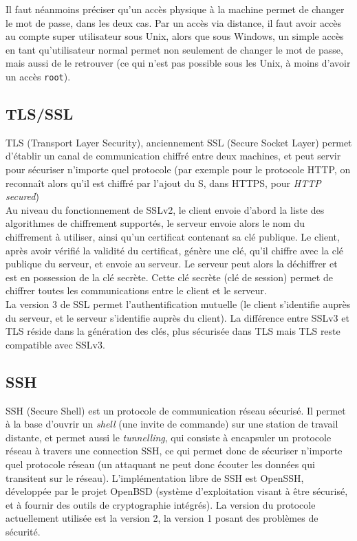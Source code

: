 Il faut néanmoins préciser qu'un accès physique à la machine
permet de changer le mot de passe, dans les deux cas. Par un accès
via distance, il faut avoir accès au compte super utilisateur sous
Unix, alors que sous Windows, un simple accès en tant
qu'utilisateur normal permet non seulement de changer le mot de
passe, mais aussi de le retrouver (ce qui n'est pas possible sous
les Unix, à moins d'avoir un accès \texttt{root}).
\subsection{TLS/SSL}
TLS (Transport Layer Security), anciennement SSL (Secure Socket
Layer) permet d'établir un canal de communication chiffré entre
deux machines, et peut servir pour sécuriser n'importe quel
protocole (par exemple pour le protocole HTTP, on reconnaît alors qu'il
est chiffré par l'ajout du S, dans HTTPS, pour \emph{HTTP
secured})
\\
 
Au niveau du fonctionnement de SSLv2, le client envoie d'abord la liste des
algorithmes de chiffrement supportés, le serveur envoie alors le
nom du chiffrement à utiliser, ainsi qu'un
certificat contenant sa clé publique. Le client, après avoir
vérifié la validité du certificat, génère une clé, qu'il
chiffre avec la clé publique du serveur, et envoie au serveur.
Le serveur peut alors la déchiffrer et est
en possession de la clé secrète.
Cette clé secrète (clé de session) permet de chiffrer toutes les
communications entre le client et le serveur.
\\

La version 3 de SSL permet l'authentification mutuelle (le client
s'identifie auprès du serveur, et le serveur s'identifie auprès du
client). La différence entre SSLv3 et TLS réside dans la
génération des clés, plus sécurisée dans TLS mais TLS reste
compatible avec SSLv3.

\subsection{SSH}
SSH (Secure Shell) est un protocole de communication réseau
sécurisé. Il permet à la base d'ouvrir un \emph{shell} (une invite
de commande) sur une station de travail distante, et permet aussi
le \emph{tunnelling}, qui consiste à encapsuler un protocole
réseau à travers une connection SSH, ce qui permet donc de
sécuriser n'importe quel protocole réseau (un attaquant ne peut
donc écouter les données qui transitent sur le réseau).
L'implémentation libre de SSH est OpenSSH, développée par le
projet OpenBSD (système d'exploitation visant à être sécurisé, et
à fournir des outils de cryptographie intégrés). La version 
du protocole
actuellement utilisée est la version 2, la version 1 posant des
problèmes de sécurité.
\\

